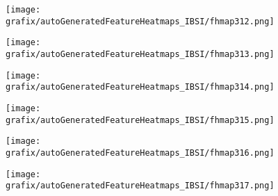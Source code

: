 \hspace{\hsp} 
\begin{subfigure}{\wid\textwidth} 
    \centering 
    \caption{\tiny \sffamily {}} 
    \vspace{\vsp} 
    \texttt{[image: grafix/autoGeneratedFeatureHeatmaps\_IBSI/fhmap312.png]} 
\end{subfigure} 
\hspace{\hsp} 
\begin{subfigure}{\wid\textwidth} 
    \centering 
    \caption{\tiny \sffamily {}} 
    \vspace{\vsp} 
    \texttt{[image: grafix/autoGeneratedFeatureHeatmaps\_IBSI/fhmap313.png]} 
\end{subfigure} 
\hspace{\hsp} 
\begin{subfigure}{\wid\textwidth} 
    \centering 
    \caption{\tiny \sffamily {}} 
    \vspace{\vsp} 
    \texttt{[image: grafix/autoGeneratedFeatureHeatmaps\_IBSI/fhmap314.png]} 
\end{subfigure} 
\hspace{\hsp} 
\begin{subfigure}{\wid\textwidth} 
    \centering 
    \caption{\tiny \sffamily {}} 
    \vspace{\vsp} 
    \texttt{[image: grafix/autoGeneratedFeatureHeatmaps\_IBSI/fhmap315.png]} 
\end{subfigure} 
\hspace{\hsp} 
\begin{subfigure}{\wid\textwidth} 
    \centering 
    \caption{\tiny \sffamily {}} 
    \vspace{\vsp} 
    \texttt{[image: grafix/autoGeneratedFeatureHeatmaps\_IBSI/fhmap316.png]} 
\end{subfigure} 
\hspace{\hsp} 
\begin{subfigure}{\wid\textwidth} 
    \centering 
    \caption{\tiny \sffamily {}} 
    \vspace{\vsp} 
    \texttt{[image: grafix/autoGeneratedFeatureHeatmaps\_IBSI/fhmap317.png]} 
\end{subfigure} 
\hspace{\hsp} 
